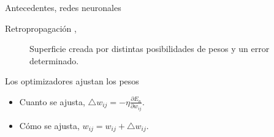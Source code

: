 \begin{frame}{Antecedentes, redes neuronales}
    \begin{block}{Retropropagación \cite{BPTT},}
    \begin{figure}
        \centering
        \caption{Superficie creada por distintas posibilidades de pesos y un error determinado.}
        \label{fig:surface}
    \end{figure}
    \end{block}
    
    \begin{block}{Los optimizadores ajustan los pesos}
    \begin{itemize}
    \item Cuanto se ajusta, $\bigtriangleup w_{ij} = -\eta \frac{\partial E_{n}}{\partial w_{ij}}$.
    \item Cómo se ajusta, $w_{ij} = w_{ij} + \bigtriangleup w_{ij}$.
    \end{itemize}
    \end{block}
\end{frame}



